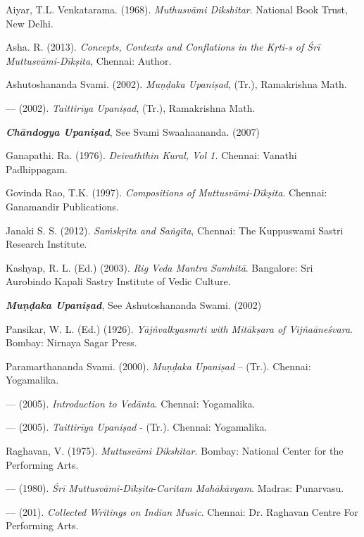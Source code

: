 \begin{thebibliography}{99}
\itemsep=1pt
 Aiyar, T.L. Venkatarama. (1968). \textit{Muthusvāmi Dikshitar}. National Book Trust, New Delhi.

  Asha. R. (2013). \textit{Concepts, Contexts and Conflations in the Kṛti-s of Śrī Muttusvāmi-Dīkṣita}, Chennai: Author.

  Ashutoshananda Svami. (2002). \textit{Muṇḍaka Upaniṣad}, (Tr.), Ramakrishna Math.

  — (2002). \textit{Taittirīya Upaniṣad}, (Tr.), Ramakrishna Math.

  \textbf{\textit{Chāndogya Upaniṣad}}, See Svami Swaahaananda. (2007)

  Ganapathi. Ra. (1976). \textit{Deivaththin Kural, Vol 1.} Chennai: Vanathi Padhippagam.

  Govinda Rao, T.K. (1997). \textit{Compositions of Muttusvāmi-Dīkṣita}. Chennai: Ganamandir Publications.

  Janaki S. S. (2012). \textit{Saṁskṛita and Saṅgīta}, Chennai: The Kuppuswami Sastri Research Institute.

  Kashyap, R. L. (Ed.) (2003). \textit{Rig Veda Mantra Samhitā}. Bangalore: Sri Aurobindo Kapali Sastry Institute of Vedic Culture.

  \textbf{\textit{Muṇḍaka Upaniṣad}}, See Ashutoshananda Swami. (2002)

  Pansikar, W. L. (Ed.) (1926). \textit{Yājñvalkyasmrti with Mitākṣara of Vijñaāneśvara}. Bombay: Nirnaya Sagar Press.

  Paramarthananda Svami. (2000). \textit{Muṇḍaka Upaniṣad} – (Tr.). Chennai: Yogamalika.

  — (2005). \textit{Introduction to Vedānta}. Chennai: Yogamalika.

  — (2005). \textit{Taittirīya Upaniṣad} - (Tr.). Chennai: Yogamalika.

  Raghavan, V. (1975). \textit{Muttusvāmi Dikshitar.} Bombay: National Center for the Performing Arts.

  — (1980). \textit{Śrī Muttusvāmi-Dīkṣita}-\textit{Caritam Mahākāvyam}. Madras: Punarvasu.

  — (201). \textit{Collected Writings on Indian Music}. Chennai: Dr. Raghavan Centre For Performing Arts.


\end{thebibliography}
